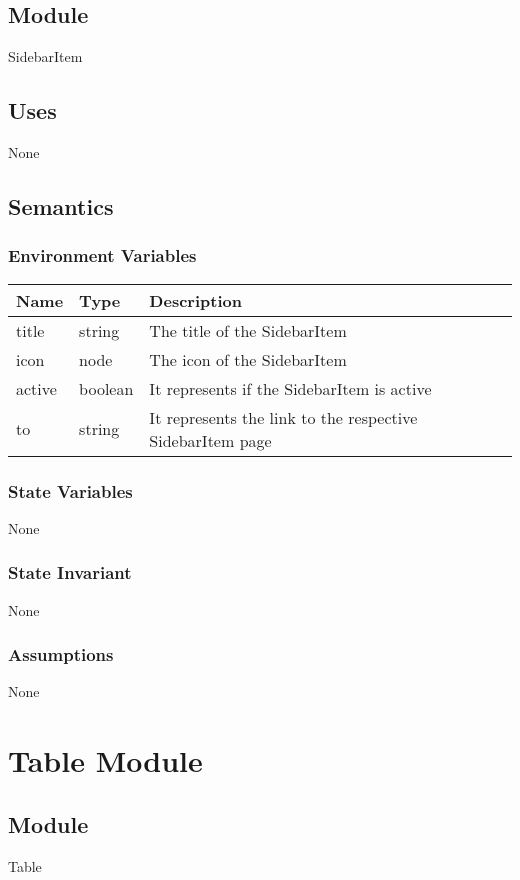 \documentclass[12pt]{article}
\begin{document}
\subsection{Module}
SidebarItem

\subsection{Uses}
None

\subsection{Semantics}

\subsubsection{Environment Variables}
\begin{tabular}{| l | l | p{10cm} |}
    \hline
    \textbf{Name} & \textbf{Type} & \textbf{Description}\\ \hline
    title & string & The title of the SidebarItem\\ \hline
    icon & node & The icon of the SidebarItem\\ \hline
    active & boolean & It represents if the SidebarItem is active\\ \hline
    to & string & It represents the link to the respective SidebarItem page\\ \hline
\end{tabular}

\subsubsection{State Variables}
None

\subsubsection{State Invariant}
None

\subsubsection{Assumptions}
None

\newpage


\section{Table Module}

\subsection{Module}
Table
\end{document}
